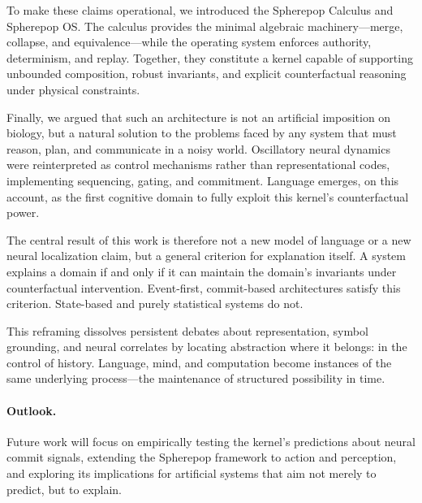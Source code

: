 \documentclass[11pt]{article}
\begin{document}
To make these claims operational, we introduced the Spherepop Calculus and Spherepop OS. The calculus provides the minimal algebraic machinery—merge, collapse, and equivalence—while the operating system enforces authority, determinism, and replay. Together, they constitute a kernel capable of supporting unbounded composition, robust invariants, and explicit counterfactual reasoning under physical constraints.

Finally, we argued that such an architecture is not an artificial imposition on biology, but a natural solution to the problems faced by any system that must reason, plan, and communicate in a noisy world. Oscillatory neural dynamics were reinterpreted as control mechanisms rather than representational codes, implementing sequencing, gating, and commitment. Language emerges, on this account, as the first cognitive domain to fully exploit this kernel’s counterfactual power.

The central result of this work is therefore not a new model of language or a new neural localization claim, but a general criterion for explanation itself. A system explains a domain if and only if it can maintain the domain’s invariants under counterfactual intervention. Event-first, commit-based architectures satisfy this criterion. State-based and purely statistical systems do not.

This reframing dissolves persistent debates about representation, symbol grounding, and neural correlates by locating abstraction where it belongs: in the control of history. Language, mind, and computation become instances of the same underlying process—the maintenance of structured possibility in time.

\paragraph{Outlook.}
Future work will focus on empirically testing the kernel’s predictions about neural commit signals, extending the Spherepop framework to action and perception, and exploring its implications for artificial systems that aim not merely to predict, but to explain.
\end{document}
